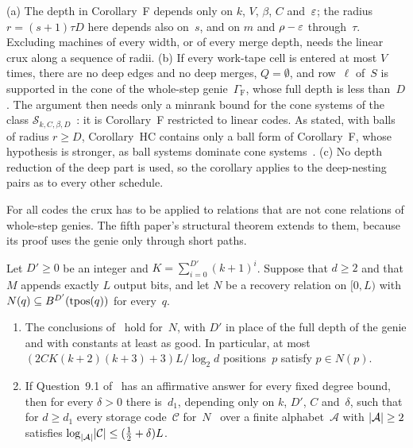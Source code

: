 \begin{remark}\label{rem:HC-scope}
(a) The depth in Corollary~F depends only on $k$, $V$, $\beta$, $C$ and~$\varepsilon$; the radius $r=(s+1)\tau D$ here depends
also on~$s$, and on $m$ and $\rho-\varepsilon$ through~$\tau$. Excluding machines of every width, or of every merge depth, needs
the linear crux along a sequence of radii. (b) If every work-tape cell is entered at most $V$ times, there are no deep
edges and no deep merges, $Q=\emptyset$, and row~$\ell$ of~$S$ is supported in the cone of the whole-step
genie~$\Gamma_{\mathrm F}$, whose full depth is less than~$D$. The argument then needs only a minrank bound for the cone
systems of the class $\mathcal S_{k,C,\beta,D}$~\cite[Definition~4.8]{FourthPaper2026}: it is Corollary~F restricted to
linear codes. As stated, with balls of radius $r\ge D$, Corollary~HC contains only a ball form of Corollary~F, whose
hypothesis is stronger, as ball systems dominate cone systems~\cite[Remark~7.6(a)]{BoundedNesting2026}. (c) No depth
reduction of the deep part is used, so the corollary applies to the deep-nesting pairs as to every other schedule.
\end{remark}

For all codes the crux has to be applied to relations that are not cone relations of whole-step genies. The fifth
paper's structural theorem extends to them, because its proof uses the genie only through short paths.

\begin{lemma}\label{lem:balls}
Let $D'\ge0$ be an integer and $K=\sum_{i=0}^{D'}(k+1)^i$. Suppose that $d\ge2$ and that $M$ appends exactly $L$ output
bits, and let $N$ be a recovery relation on $[0,L)$ with $N(q)\subseteq B^{D'}(\operatorname{tpos}(q))$ for every~$q$.
\begin{enumerate}[label=(\alph*)]
\item The conclusions of~\cite[Theorem~3.3, Corollary~3.7 and Corollary~3.8]{DirectedRecovery2026} hold for~$N$, with
$D'$ in place of the full depth of the genie and with constants at least as good. In particular, at most
$(2CK(k+2)(k+3)+3)L/\log_2d$ positions~$p$ satisfy $p\in N(p)$.
\item If Question~9.1 of~\cite{DirectedRecovery2026} has an affirmative answer for every fixed degree bound, then for
every $\delta>0$ there is~$d_1$, depending only on $k$, $D'$, $C$ and~$\delta$, such that for $d\ge d_1$ every storage
code~$\mathcal C$ for~$N$~\cite[Definition~2.1]{DirectedRecovery2026} over a finite alphabet~$\mathcal A$ with
$\lvert \mathcal A \rvert\ge2$ satisfies $\log_{\lvert \mathcal A \rvert}\lvert \mathcal C \rvert\le(\frac12+\delta)L$.
\end{enumerate}
\end{lemma}

